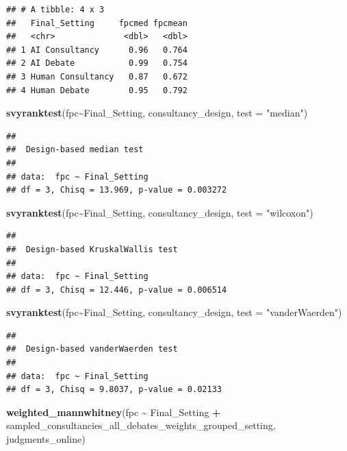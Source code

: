 \documentclass[
]{article}
\newenvironment{Shaded}{\begin{snugshade}}{\end{snugshade}}
\newcommand{\AttributeTok}[1]{\textcolor[rgb]{0.13,0.29,0.53}{#1}}
\newcommand{\FunctionTok}[1]{\textcolor[rgb]{0.13,0.29,0.53}{\textbf{#1}}}
\newcommand{\NormalTok}[1]{#1}
\newcommand{\SpecialCharTok}[1]{\textcolor[rgb]{0.81,0.36,0.00}{\textbf{#1}}}
\newcommand{\StringTok}[1]{\textcolor[rgb]{0.31,0.60,0.02}{#1}}
\begin{document}
\begin{verbatim}
## # A tibble: 4 x 3
##   Final_Setting     fpcmed fpcmean
##   <chr>              <dbl>   <dbl>
## 1 AI Consultancy      0.96   0.764
## 2 AI Debate           0.99   0.754
## 3 Human Consultancy   0.87   0.672
## 4 Human Debate        0.95   0.792
\end{verbatim}

\begin{Shaded}
\begin{Highlighting}[]
\FunctionTok{svyranktest}\NormalTok{(fpc}\SpecialCharTok{\textasciitilde{}}\NormalTok{Final\_Setting, consultancy\_design, }\AttributeTok{test =} \StringTok{"median"}\NormalTok{)}
\end{Highlighting}
\end{Shaded}

\begin{verbatim}
## 
##  Design-based median test
## 
## data:  fpc ~ Final_Setting
## df = 3, Chisq = 13.969, p-value = 0.003272
\end{verbatim}

\begin{Shaded}
\begin{Highlighting}[]
\FunctionTok{svyranktest}\NormalTok{(fpc}\SpecialCharTok{\textasciitilde{}}\NormalTok{Final\_Setting, consultancy\_design, }\AttributeTok{test =} \StringTok{"wilcoxon"}\NormalTok{)}
\end{Highlighting}
\end{Shaded}

\begin{verbatim}
## 
##  Design-based KruskalWallis test
## 
## data:  fpc ~ Final_Setting
## df = 3, Chisq = 12.446, p-value = 0.006514
\end{verbatim}

\begin{Shaded}
\begin{Highlighting}[]
\FunctionTok{svyranktest}\NormalTok{(fpc}\SpecialCharTok{\textasciitilde{}}\NormalTok{Final\_Setting, consultancy\_design, }\AttributeTok{test =} \StringTok{"vanderWaerden"}\NormalTok{)}
\end{Highlighting}
\end{Shaded}

\begin{verbatim}
## 
##  Design-based vanderWaerden test
## 
## data:  fpc ~ Final_Setting
## df = 3, Chisq = 9.8037, p-value = 0.02133
\end{verbatim}

\begin{Shaded}
\begin{Highlighting}[]
\FunctionTok{weighted\_mannwhitney}\NormalTok{(fpc }\SpecialCharTok{\textasciitilde{}}\NormalTok{ Final\_Setting }\SpecialCharTok{+}\NormalTok{ sampled\_consultancies\_all\_debates\_weights\_grouped\_setting, judgments\_online)}
\end{Highlighting}
\end{Shaded}
\end{document}
